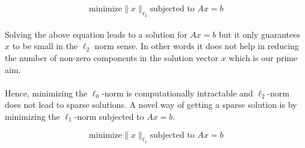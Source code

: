 \begin{equation}
\mbox{minimize} \parallel x \parallel_{\ell_2} \mbox{subjected to }Ax=b
\label{1.5}
\end{equation}

\paragraph{}Solving the above equation leads to a solution for $Ax=b$ but it only guarantees $x$ to be small 
in the $\ell_2$ norm sense. In other words it does not help in reducing the number of non-zero components in the solution vector $x$ 
which is our prime aim.

\nomenclature[gp]{$\pi$}{ $\simeq 3.14\ldots$}                                             %

\paragraph{}Hence, minimizing the $\ell_0$-norm is computationally intractable and $\ell_2$-norm does not lead to sparse solutions.
A novel way of getting a sparse solution is by minimizing the $\ell_1$-norm subjected to $Ax = b$.

\begin{equation}
\mbox{minimize} \parallel x \parallel_{\ell_1} \mbox{subjected to }Ax=b
\label{1.6}
\end{equation}

